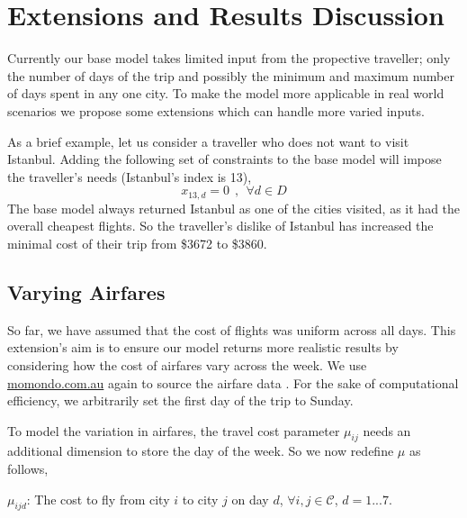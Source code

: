 \documentclass[12pt]{article}
\begin{document}

\section{Extensions and Results Discussion} 
\label{sec:extensions}


Currently our base model takes limited input from the propective traveller; only the number of days of the trip and possibly the minimum and maximum number of days spent in any one city. To make the model more applicable in real world scenarios we propose some extensions which can handle more varied inputs.

As a brief example, let us consider a traveller who does not want to visit Istanbul. Adding the following set of constraints to the base model will impose the traveller's needs (Istanbul's index is 13),
$$	x_{13,d} = 0~~,~~ \forall d \in D	$$
The base model always returned Istanbul as one of the cities visited, as it had the overall cheapest flights. So the traveller's dislike of Istanbul has increased the minimal cost of their trip from \$3672 to \$3860.

\subsection{Varying Airfares}
So far, we have assumed that the cost of flights was uniform across all days. This extension's aim is to ensure our model returns more realistic results by considering how the cost of airfares vary across the week. We use \url{momondo.com.au} again to source the airfare data \cite{momondo}. For the sake of computational efficiency, we arbitrarily set the first day of the trip to Sunday.

To model the variation in airfares, the travel cost parameter $\mu_{ij}$ needs an additional dimension to store the day of the week. So we now redefine $\mu$ as follows,

$\mu_{ijd}$: The cost to fly from city $i$ to city $j$ on day $d$, $\forall i,j \in \mathcal{C}$, $d=1...7$.
\end{document}
